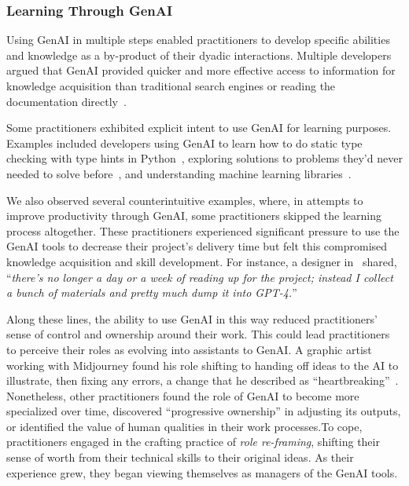 \subsubsection{Learning Through GenAI}
Using GenAI in multiple steps enabled practitioners to develop specific abilities and knowledge as a by-product of their dyadic interactions. Multiple developers argued that GenAI provided quicker and more effective access to information for knowledge acquisition than traditional search engines or reading the documentation directly~\cite{8,3}. 

Some practitioners exhibited explicit intent to use GenAI for learning purposes. Examples included developers using GenAI to learn how to do static type checking with type hints in Python~\cite{23}, exploring solutions to problems they'd never needed to solve before~\cite{4}, and understanding machine learning libraries~\cite{23}.

We also observed several counterintuitive examples, where, in attempts to improve productivity through GenAI, some practitioners skipped the learning process altogether. These practitioners experienced significant pressure to use the GenAI tools to decrease their project's delivery time but felt this compromised knowledge acquisition and skill development. For instance, a designer in~\cite{18} shared, ``\textit{there's no longer a day or a week of reading up for the project; instead I collect a bunch of materials and pretty much dump it into GPT-4.}''

Along these lines, the ability to use GenAI in this way reduced practitioners' sense of control and ownership around their work. This could lead practitioners to perceive their roles as evolving into assistants to GenAI. A graphic artist working with Midjourney found his role shifting to handing off ideas to the AI to illustrate, then fixing any errors, a change that he described as ``heartbreaking''~\cite{9}. Nonetheless, other practitioners found the role of GenAI to become more specialized over time, discovered ``progressive ownership'' in adjusting its outputs, or identified the value of human qualities in their work processes.To cope, practitioners engaged in the crafting practice of \textit{role re-framing}, shifting their sense of worth from their technical skills to their original ideas. As their experience grew, they began viewing themselves as managers of the GenAI tools. 

